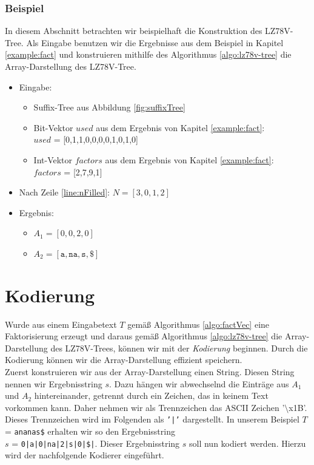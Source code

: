 \documentclass[a4paper,11pt]{scrartcl}%
\theoremstyle{change}
\theoremstyle{nonumberplain}
\theoremstyle{change}
\theoremstyle{nonumberplain}
\theoremstyle{change}
\theoremstyle{nonumberplain}
\begin{document}
\subsubsection{Beispiel}

In diesem Abschnitt betrachten wir beispielhaft die Konstruktion des LZ78V-Tree. Als Eingabe benutzen wir die Ergebnisse aus dem Beispiel in Kapitel \ref{example:fact} und konstruieren mithilfe des Algorithmus \ref{algo:lz78v-tree} die Array-Darstellung des LZ78V-Tree.\\

\begin{itemize}
\item Eingabe: 
	\begin{itemize}
		\item Suffix-Tree aus Abbildung \ref{fig:suffixTree}
		\item Bit-Vektor $used$ aus dem Ergebnis von Kapitel \ref{example:fact}: \\
		$used$ = [0,1,1,0,0,0,0,1,0,1,0]
		\item Int-Vektor $factors$ aus dem Ergebnis von Kapitel \ref{example:fact}: \\
		$factors$ = [2,7,9,1]
	\end{itemize}
	
\item Nach Zeile \ref{line:nFilled}: $N = [3,0,1,2]$
\item Ergebnis:
	\begin{itemize}
		\item $A_1 = [0 ,0 , 2, 0]$
		\item $A_2 = [\texttt{a}, \texttt{na}, \texttt{s}, \texttt{\$}]$
	\end{itemize}
\end{itemize}

\section{Kodierung}\label{encode}

Wurde aus einem Eingabetext $T$ gemäß Algorithmus \ref{algo:factVec} eine Faktorisierung erzeugt und daraus gemäß Algorithmus \ref{algo:lz78v-tree} die Array-Darstellung des LZ78V-Trees, können wir mit der \textit{Kodierung} beginnen. Durch die Kodierung können wir die Array-Darstellung effizient speichern.\\
Zuerst konstruieren wir aus der Array-Darstellung einen String. Diesen String nennen wir Ergebnisstring $s$. Dazu hängen wir abwechselnd die Einträge aus $A_1$ und $A_2$ hintereinander, getrennt durch ein Zeichen, das in keinem Text vorkommen kann. Daher nehmen wir als Trennzeichen das ASCII Zeichen '$\setminus$x1B'. Dieses Trennzeichen wird im Folgenden als \texttt{'|'} dargestellt.
In unserem Beispiel $T$ = \texttt{ananas\$} erhalten wir so den Ergebnisstring \\$s$ = \texttt{0|a|0|na|2|s|0|\$|}.
Dieser Ergebnisstring $s$ soll nun kodiert werden. Hierzu wird der nachfolgende Kodierer eingeführt.
\end{document}
